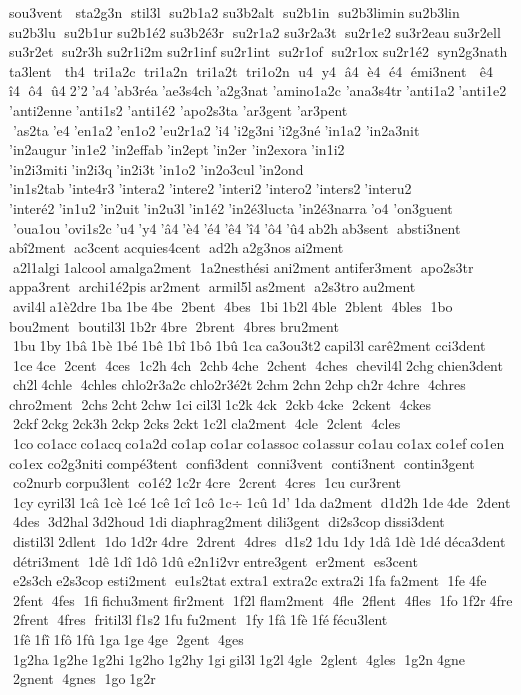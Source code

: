  sou3vent   sta2g3n  stil3l  su2b1a2 	 su3b2alt  su2b1in  su2b3limin 	 su2b3lin  su2b3lu  su2b1ur 	 su2b1é2 
 su3b2é3r  su2r1a2 	 su3r2a3t  su2r1e2 	 su3r2eau 	 su3r2ell  su3r2et  su2r3h 	 su2r1i2m 	 su2r1inf 	 su2r1int  su2r1of  su2r1ox 	 su2r1é2  syn2g3nath 	 ta3lent   th4  tri1a2c  tri1a2n  tri1a2t  tri1o2n  u4  y4  â4  è4  é4  émi3nent   ê4  î4  ô4  û4 2'2 'a4 'ab3réa 'ae3s4ch 'a2g3nat 
'amino1a2c 	'ana3s4tr 'anti1a2 'anti1e2 
'anti2enne 'anti1s2 	'anti1é2 	'apo2s3ta 	'ar3gent  	'ar3pent  'as2ta 'e4 'en1a2 'en1o2 'eu2r1a2 'i4 'i2g3ni 'i2g3né 'in1a2 	'in2a3nit 	'in2augur 'in1e2 	'in2effab 'in2ept 'in2er 	'in2exora 'in1i2 
'in2i3miti 'in2i3q 'in2i3t 'in1o2 	'in2o3cul 'in2ond 	'in1s2tab 'inte4r3 'intera2 'intere2 'interi2 'intero2 'inters2 'interu2 	'interé2 'in1u2 'in2uit 'in2u3l 'in1é2 'in2é3lucta 'in2é3narra 'o4 
'on3guent  'oua1ou 'ovi1s2c 'u4 'y4 'â4 'è4 'é4 'ê4 'î4 'ô4 'û4 ab2h ab3sent  absti3nent  
abî2ment  ac3cent  
acquies4cent  ad2h a2g3nos ai2ment  a2l1algi 1alcool amalga2ment  1a2nesthési 	ani2ment  
antifer3ment  apo2s3tr 
appa3rent  archi1é2pis ar2ment  armil5l as2ment  a2s3tro au2ment  avil4l a1è2dre 1ba 1be 4be  2bent  4bes  1bi 1b2l 4ble  2blent  4bles  1bo 	bou2ment  boutil3l 1b2r 4bre  2brent  4bres  	bru2ment  1bu 1by 1bâ 1bè 1bé 1bê 1bî 1bô 1bû 1ca ca3ou3t2 capil3l carê2ment  	cci3dent  1ce 4ce  2cent  4ces  1c2h 4ch  2chb 4che  2chent  4ches  chevil4l 2chg chien3dent  ch2l 4chle  4chles  
chlo2r3a2c chlo2r3é2t 2chm 2chn 2chp ch2r 4chre  4chres  
chro2ment  2chs 2cht 2chw 1ci cil3l 1c2k 4ck  2ckb 4cke  2ckent  4ckes  2ckf 2ckg 2ck3h 2ckp 2cks 2ckt 1c2l 	cla2ment  4cle  2clent  4cles  1co co1acc co1acq co1a2d co1ap co1ar co1assoc co1assur co1au co1ax co1ef co1en co1ex 	co2g3niti compé3tent  confi3dent  conni3vent  conti3nent  contin3gent  co2nurb corpu3lent  co1é2 1c2r 4cre  2crent  4cres  1cu 	cur3rent  1cy cyril3l 1câ 1cè 1cé 1cê 1cî 1cô 1c÷ 1cû 1d' 1da da2ment  d1d2h 1de 4de  2dent  4des  3d2hal 3d2houd 1di diaphrag2ment  
dili3gent  di2s3cop dissi3dent  distil3l 2dlent  1do 1d2r 4dre  2drent  4dres  d1s2 1du 1dy 1dâ 1dè 1dé déca3dent  détri3ment  1dê 1dî 1dô 1dû e2n1i2vr entre3gent  er2ment  es3cent  e2s3ch e2s3cop 
esti2ment  eu1s2tat extra1 extra2c extra2i 1fa fa2ment  1fe 4fe  2fent  4fes  1fi fichu3ment  	fir2ment  1f2l 
flam2ment  4fle  2flent  4fles  1fo 1f2r 4fre  2frent  4fres  fritil3l f1s2 1fu fu2ment  1fy 1fâ 1fè 1fé fécu3lent  1fê 1fî 1fô 1fû 1ga 1ge 4ge  2gent  4ges  1g2ha 1g2he 1g2hi 1g2ho 1g2hy 1gi gil3l 1g2l 4gle  2glent  4gles  1g2n 4gne  2gnent  4gnes  1go 1g2r 
